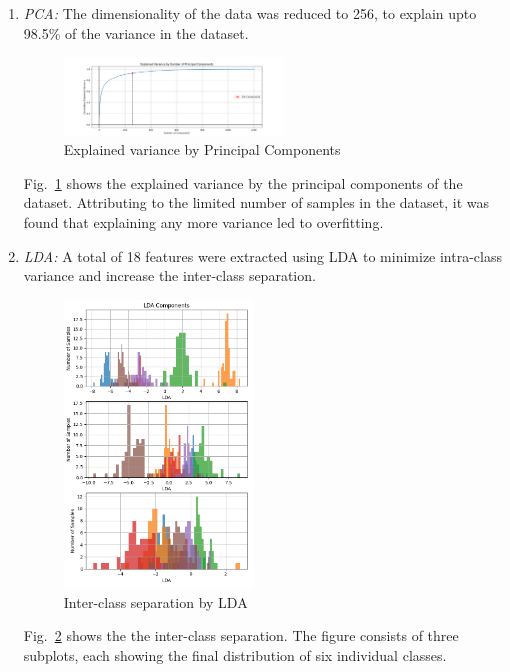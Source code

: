 \documentclass[conference]{IEEEtran}
\begin{document}
    \begin{enumerate}
        \item \textit{PCA:}
        The dimensionality of the data was reduced to 256, to explain upto 98.5\% of the variance in the dataset.

        \begin{figure}[htbp]
            \centerline{\includegraphics[width=0.55\textwidth]{Assets/pca.png}}
            \caption{Explained variance by Principal Components}
            \label{fig:pca}
        \end{figure}

        Fig.~\ref{fig:pca} shows the explained variance by the principal components of the dataset.
        Attributing to the limited number of samples in the dataset, it was found that explaining any more variance led to overfitting.

        \item \textit{LDA:}
        A total of 18 features were extracted using LDA to minimize intra-class variance and increase the inter-class separation.

        \begin{figure}[htbp]
            \centerline{\includegraphics[width=0.475\textwidth]{Assets/lda.png}}
            \caption{Inter-class separation by LDA}
            \label{fig:lda}
        \end{figure}

        Fig.~\ref{fig:lda} shows the the inter-class separation.
        The figure consists of three subplots, each showing the final distribution of six individual classes.
    \end{enumerate}
\end{document}
